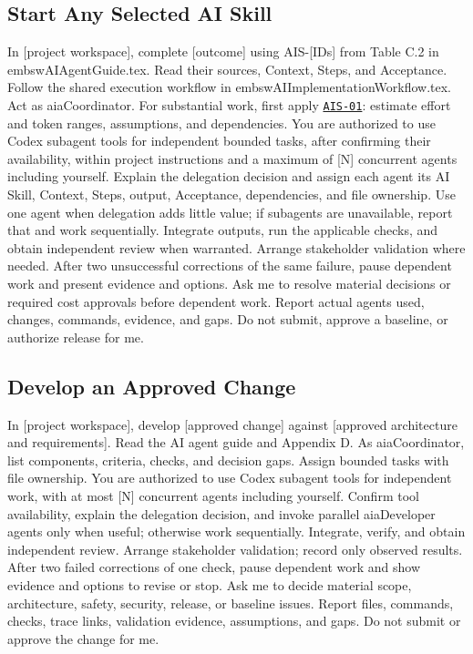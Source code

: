 \begin{samepage}
\subsection{Start Any Selected AI Skill}
\label{Section:AIStartSelectedTaskPrompt}

\begingroup\ttfamily\raggedright
\noindent In [project workspace], complete [outcome] using AIS-[IDs] from Table C.2 in embswAIAgentGuide.tex. Read their sources, Context, Steps, and Acceptance. Follow the shared execution workflow in embswAIImplementationWorkflow.tex. Act as aiaCoordinator. For substantial work, first apply \hyperref[Skill:AIS-01]{\texttt{AIS-01}}: estimate effort and token ranges, assumptions, and dependencies. You are authorized to use Codex subagent tools for independent bounded tasks, after confirming their availability, within project instructions and a maximum of [N] concurrent agents including yourself. Explain the delegation decision and assign each agent its AI Skill, Context, Steps, output, Acceptance, dependencies, and file ownership. Use one agent when delegation adds little value; if subagents are unavailable, report that and work sequentially. Integrate outputs, run the applicable checks, and obtain independent review when warranted. Arrange stakeholder validation where needed. After two unsuccessful corrections of the same failure, pause dependent work and present evidence and options. Ask me to resolve material decisions or required cost approvals before dependent work. Report actual agents used, changes, commands, evidence, and gaps. Do not submit, approve a baseline, or authorize release for me.\par
\endgroup

\end{samepage}

\begin{samepage}
\subsection{Develop an Approved Change}

\begingroup\ttfamily\raggedright
\noindent In [project workspace], develop [approved change] against [approved architecture and requirements]. Read the AI agent guide and Appendix D. As aiaCoordinator, list components, criteria, checks, and decision gaps. Assign bounded tasks with file ownership. You are authorized to use Codex subagent tools for independent work, with at most [N] concurrent agents including yourself. Confirm tool availability, explain the delegation decision, and invoke parallel aiaDeveloper agents only when useful; otherwise work sequentially. Integrate, verify, and obtain independent review. Arrange stakeholder validation; record only observed results. After two failed corrections of one check, pause dependent work and show evidence and options to revise or stop. Ask me to decide material scope, architecture, safety, security, release, or baseline issues. Report files, commands, checks, trace links, validation evidence, assumptions, and gaps. Do not submit or approve the change for me.\par
\endgroup

\end{samepage}

